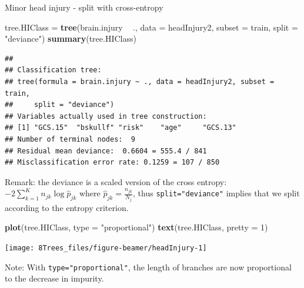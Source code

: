 \documentclass[10pt,ignorenonframetext,]{beamer}
\newenvironment{Shaded}{\begin{snugshade}}{\end{snugshade}}
\newcommand{\KeywordTok}[1]{\textcolor[rgb]{0.13,0.29,0.53}{\textbf{#1}}}
\newcommand{\DataTypeTok}[1]{\textcolor[rgb]{0.13,0.29,0.53}{#1}}
\newcommand{\DecValTok}[1]{\textcolor[rgb]{0.00,0.00,0.81}{#1}}
\newcommand{\StringTok}[1]{\textcolor[rgb]{0.31,0.60,0.02}{#1}}
\newcommand{\OperatorTok}[1]{\textcolor[rgb]{0.81,0.36,0.00}{\textbf{#1}}}
\newcommand{\NormalTok}[1]{#1}
\begin{document}
\begin{frame}[fragile]

\begin{block}{Minor head injury - split with cross-entropy}

\footnotesize

\begin{Shaded}
\begin{Highlighting}[]
\NormalTok{tree.HIClass =}\StringTok{ }\KeywordTok{tree}\NormalTok{(brain.injury }\OperatorTok{~}\StringTok{ }\NormalTok{., }\DataTypeTok{data =}\NormalTok{ headInjury2, }\DataTypeTok{subset =}\NormalTok{ train, }
    \DataTypeTok{split =} \StringTok{"deviance"}\NormalTok{)}
\KeywordTok{summary}\NormalTok{(tree.HIClass)}
\end{Highlighting}
\end{Shaded}

\begin{verbatim}
## 
## Classification tree:
## tree(formula = brain.injury ~ ., data = headInjury2, subset = train, 
##     split = "deviance")
## Variables actually used in tree construction:
## [1] "GCS.15"  "bskullf" "risk"    "age"     "GCS.13" 
## Number of terminal nodes:  9 
## Residual mean deviance:  0.6604 = 555.4 / 841 
## Misclassification error rate: 0.1259 = 107 / 850
\end{verbatim}

\normalsize

Remark: the deviance is a scaled version of the cross entropy:
\(-2\sum_{k=1}^K n_{jk} \log\hat{p}_{jk}\) where
\(\hat{p}_{jk}=\frac{n_{jk}}{N_j}\), thus \texttt{split="deviance"}
implies that we split according to the entropy criterion.

\end{block}

\end{frame}

\begin{frame}[fragile]

\begin{Shaded}
\begin{Highlighting}[]
\KeywordTok{plot}\NormalTok{(tree.HIClass, }\DataTypeTok{type =} \StringTok{"proportional"}\NormalTok{)}
\KeywordTok{text}\NormalTok{(tree.HIClass, }\DataTypeTok{pretty =} \DecValTok{1}\NormalTok{)}
\end{Highlighting}
\end{Shaded}

\begin{center}\texttt{[image: 8Trees\_files/figure-beamer/headInjury-1]} \end{center}

Note: With \texttt{type="proportional"}, the length of branches are now
proportional to the decrease in impurity.

\end{frame}
\end{document}
